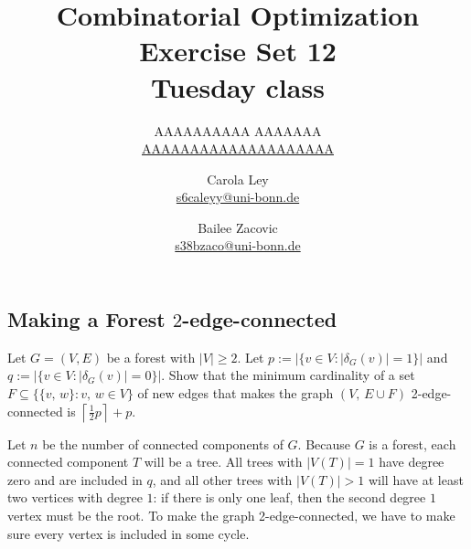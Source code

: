 \documentclass{article}
\title{Combinatorial Optimization \\ Exercise Set 12 \\ Tuesday class}
\author{
  AAAAAAAAAA AAAAAAA \\
  \href{mailto:AAAAAAAAAAAAAAAAAAAA}{AAAAAAAAAAAAAAAAAAAA}
  \and
  Carola Ley \\
  \href{mailto:s6caleyy@uni-bonn.de}{s6caleyy@uni-bonn.de}
  \and
  Bailee Zacovic \\
  \href{mailto:s38bzaco@uni-bonn.de}{s38bzaco@uni-bonn.de}
}
\begin{document}
  \maketitle

  \setcounter{section}{12}
  \subsection{Making a Forest $2$-edge-connected}
  \begin{centerframebox}
    Let $G = (V, E)$ be a forest with $|V| \geq 2$.
    Let $p := |\{v \in V : |\delta_G(v)| = 1\}|$ and $q := |\{v \in V : |\delta_G(v)| = 0\}|$.
    Show that the minimum cardinality of a set $F \subseteq \{\{v,\, w\} : v,\, w \in V\}$
    of new edges that makes the graph $(V,\, E \cup F)$ 2-edge-connected is $\left\lceil\frac{1}{2} p\right\rceil + p$.
  \end{centerframebox}
  Let $n$ be the number of connected components of $G$.
  Because $G$ is a forest, each connected component $T$ will be a tree.
  All trees with $|V(T)| = 1$ have degree zero and are included in $q$,
  and all other trees with $|V(T)| > 1$ will have at least two vertices with degree $1$:
  if there is only one leaf, then the second degree $1$ vertex must be the root.
  To make the graph 2-edge-connected, we have to make sure every vertex is included in some cycle.
\end{document}
